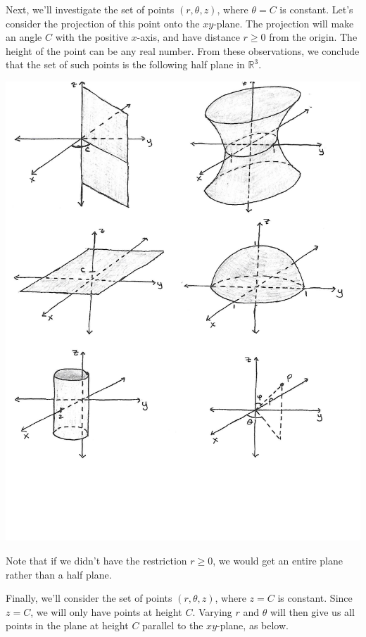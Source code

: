 \documentclass{ximera}
\begin{document}
Next, we'll investigate the set of points $(r,\theta,z)$, where $\theta = C$ is constant. Let's consider the projection of this point onto the $xy$-plane. The projection will make an angle $C$ with the positive $x$-axis, and have distance $r\geq 0$ from the origin. The height of the point can be any real number. From these observations, we conclude that the set of such points is the following half plane in $\mathbb{R}^3$.

\begin{image}
\includegraphics{theta_constant}
\end{image}

Note that if we didn't have the restriction $r\geq 0$, we would get an entire plane rather than a half plane.

Finally, we'll consider the set of points $(r,\theta, z)$, where $z = C$ is constant. Since $z = C$, we will only have points at height $C$. Varying $r$ and $\theta$ will then give us all points in the plane at height $C$ parallel to the $xy$-plane, as below.
\end{document}
